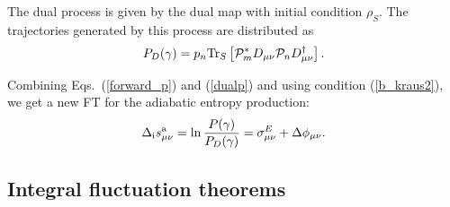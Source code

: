 \documentclass[aps,prx,twocolumn,showpacs,floatfix,superscriptaddress,graphics,longbibliography]{revtex4-1}
\begin{document}
The dual process is given by the dual map with initial condition $\rho_S$. The trajectories generated by this process are distributed as
\begin{equation}\label{dualp}
P_D(\gamma)=p_n{\rm Tr}_S\left[ {\cal P}_m^* D_{\mu\nu} {\cal P}_nD_{\mu\nu}^\dagger\right].
\end{equation}

Combining Eqs.~(\ref{forward_p}) and (\ref{dualp}) and using condition (\ref{b_kraus2}), we get a new FT for the adiabatic entropy production:
\begin{equation}\label{sa2}
\Delta_{\rm i} s^{\rm a}_{\mu \nu}  = \ln \frac{P (\gamma)}{P_D (\gamma)} = \sigma^E_{\mu \nu} + \Delta \phi_{\mu \nu}.
\end{equation}

\subsection{Integral fluctuation theorems}
\end{document}
